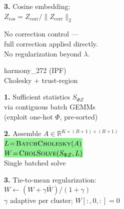 \documentclass[8pt]{article}
\newlength{\colw}
\begin{document}
\begin{minipage}[t]{\colw}
\begin{stepbox}
\textbf{3.} Cosine embedding:\\
$Z_\text{cos}\!=\!Z_\text{corr}/\|Z_\text{corr}\|_2$
\end{stepbox}

\vspace{4pt}
\begin{center}
{\scriptsize\color{black!50} No correction control ---\\
full correction applied directly.\\
No regularization beyond $\lambda$.}
\end{center}
\end{minipage}%
\hfill
\begin{minipage}[t]{\colw}
\begin{tcolorbox}[colback=hdrB, colframe=hdrB, fontupper=\bfseries\footnotesize\color{white},
    arc=2pt, left=2pt, right=2pt, top=1pt, bottom=1pt]
\centering harmony\_272 (IPF)\\[-2pt]
{\scriptsize\mdseries Cholesky + trust-region}
\end{tcolorbox}
\vspace{1pt}

\begin{keyboxG}
\textbf{1.} Sufficient statistics $S_{\Phi Z}$\\
via contiguous batch GEMMs\\
{\scriptsize (exploit one-hot $\Phi$, pre-sorted)}
\end{keyboxG}\vspace{1pt}

\begin{keyboxG}
\textbf{2.} Assemble $A\!\in\!\mathbb{R}^{K\times(B{+}1)\times(B{+}1)}$\\
\colorbox{lightgreen}{$L\!=\!\textsc{BatchCholesky}(A)$}\\
\colorbox{lightgreen}{$W\!=\!\textsc{CholSolve}(S_{\Phi Z},L)$}\\
{\scriptsize\color{added} Single batched solve}
\end{keyboxG}\vspace{1pt}

\begin{keyboxG}
\textbf{3.} Tie-to-mean regularization:\\
$W\!\gets\!(W\!+\!\gamma\bar{W})/(1\!+\!\gamma)$\\
{\scriptsize $\gamma$ adaptive per cluster; $W[:,0,:]\!=\!0$}
\end{keyboxG}\vspace{1pt}


\end{minipage}
\end{document}
